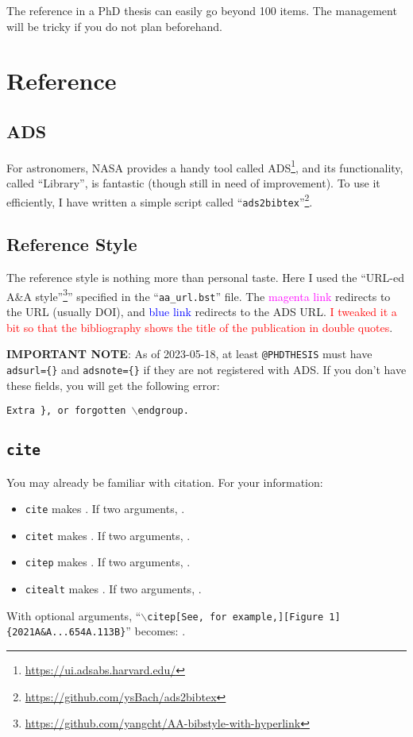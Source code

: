 The reference in a PhD thesis can easily go beyond 100 items. The management will be tricky if you do not plan beforehand.

\section{Reference}
\subsection{ADS}
For astronomers, NASA provides a handy tool called ADS\footnote{\url{https://ui.adsabs.harvard.edu/}}, and its functionality, called ``Library'', is fantastic (though still in need of improvement). To use it efficiently, I have written a simple script called ``\texttt{ads2bibtex}''\footnote{\url{https://github.com/ysBach/ads2bibtex}}.


\subsection{Reference Style}\label{ss:ref style}
The reference style is nothing more than personal taste. Here I used the ``URL-ed A\&A style''\footnote{\url{https://github.com/yangcht/AA-bibstyle-with-hyperlink}}'' specified in the ``\texttt{aa\_url.bst}'' file. The \textcolor{magenta}{magenta link} redirects to the URL (usually DOI), and \textcolor{blue}{blue link} redirects to the ADS URL.
\textcolor{red}{I tweaked it a bit so that the bibliography shows the title of the publication in double quotes}.

\textbf{IMPORTANT NOTE}: As of 2023-05-18, at least \texttt{@PHDTHESIS} must have \texttt{adsurl=\{\}} and \texttt{adsnote=\{\}} if they are not registered with ADS. If you don't have these fields, you will get the following error:

  \texttt{Extra \}, or forgotten $\backslash$endgroup.}


\subsection{\texttt{cite}}\label{ss:cite}
You may already be familiar with citation. For your information:
\begin{itemize}[itemsep=-5pt, topsep=0pt, partopsep=0pt]
\item \texttt{cite} makes \cite{2021A&A...654A.113B}. If two arguments, \cite{2021A&A...654A.113B,2022MNRAS.509.4128I}.
\item \texttt{citet} makes \citet{2021A&A...654A.113B}. If two arguments, \citet{2021A&A...654A.113B,2022MNRAS.509.4128I}.
\item \texttt{citep} makes \citep{2021A&A...654A.113B}. If two arguments, \citep{2021A&A...654A.113B,2022MNRAS.509.4128I}.
\item \texttt{citealt} makes \citealt{2021A&A...654A.113B}. If two arguments, \citealt{2021A&A...654A.113B,2022MNRAS.509.4128I}.
\end{itemize}
With optional arguments, ``\texttt{$\backslash$citep[See, for example,][Figure 1]\{2021A\&A...654A.113B\}}'' becomes: \citep[See, e.g.,][Figure 1]{2021A&A...654A.113B}.


